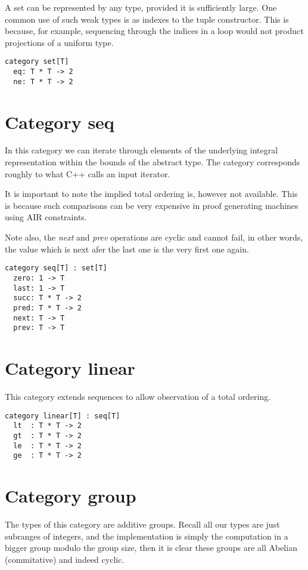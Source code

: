 \documentclass[oneside]{book}
\theoremstyle{plain}
\theoremstyle{definition}
\theoremstyle{plain}
\begin{document}
A set can be represented by any type, provided it is sufficiently large.
One common use of such weak types is as indexes to the tuple constructor.
This is because, for example, sequencing through the indices in a loop
would not product projections of a uniform type.

\begin{verbatim}
category set[T]
  eq: T * T -> 2
  ne: T * T -> 2
\end{verbatim}

\section{Category seq}
In this category we can iterate through elements of the underlying
integral representation within the bounds of the abstract type.
The category corresponds roughly to what C++ calls an input iterator.

It is important to note the implied total ordering is, however
not available. This is because such comparisons can be very
expensive in proof generating machines using AIR constraints.

Note also, the {\em next} and {\em prev} operations are cyclic and
cannot fail, in other words, the value which is next afer the last
one is the very first one again.

\begin{verbatim}
category seq[T] : set[T]
  zero: 1 -> T
  last: 1 -> T
  succ: T * T -> 2
  pred: T * T -> 2
  next: T -> T
  prev: T -> T
\end{verbatim}

\section{Category linear}
This category extends sequences to allow observation of a total ordering.

\begin{verbatim}
category linear[T] : seq[T]
  lt  : T * T -> 2
  gt  : T * T -> 2
  le  : T * T -> 2
  ge  : T * T -> 2
\end{verbatim}

\section{Category group}
The types of this category are additive groups. Recall all our types are
just subranges of integers, and the implementation is simply the
computation in a bigger group modulo the group size, then it is clear
these groups are all Abelian (commitative) and indeed cyclic.
\end{document}
